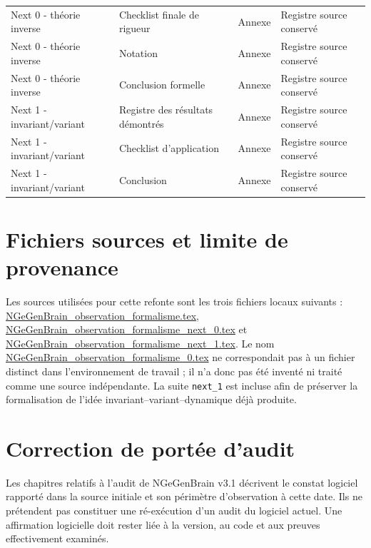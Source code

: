 \documentclass[11pt,oneside]{book}
\theoremstyle{definition}
\theoremstyle{remark}
\newcommand{\1}{\mathbf 1}
\begin{document}
\begin{longtable}{>{\raggedright\arraybackslash}p{} >{\raggedright\arraybackslash}p{} >{\raggedright\arraybackslash}p{} >{\raggedright\arraybackslash}p{}}
Next 0 - théorie inverse & Checklist finale de rigueur & Annexe & Registre source conservé \\

Next 0 - théorie inverse & Notation & Annexe & Registre source conservé \\

Next 0 - théorie inverse & Conclusion formelle & Annexe & Registre source conservé \\

Next 1 - invariant/variant & Registre des résultats démontrés & Annexe & Registre source conservé \\

Next 1 - invariant/variant & Checklist d'application & Annexe & Registre source conservé \\

Next 1 - invariant/variant & Conclusion & Annexe & Registre source conservé \\

\bottomrule
\end{longtable}
\section{Fichiers sources et limite de provenance}
Les sources utilisées pour cette refonte sont les trois fichiers locaux suivants : \url{NGeGenBrain_observation_formalisme.tex}, \url{NGeGenBrain_observation_formalisme_next_0.tex} et \url{NGeGenBrain_observation_formalisme_next_1.tex}. Le nom \url{NGeGenBrain_observation_formalisme_0.tex} ne correspondait pas à un fichier distinct dans l'environnement de travail ; il n'a donc pas été inventé ni traité comme une source indépendante. La suite \texttt{next\_1} est incluse afin de préserver la formalisation de l'idée invariant--variant--dynamique déjà produite.

\section{Correction de portée d'audit}
Les chapitres relatifs à l'audit de NGeGenBrain v3.1 décrivent le constat logiciel rapporté dans la source initiale et son périmètre d'observation à cette date. Ils ne prétendent pas constituer une ré-exécution d'un audit du logiciel actuel. Une affirmation logicielle doit rester liée à la version, au code et aux preuves effectivement examinés.
\end{document}
